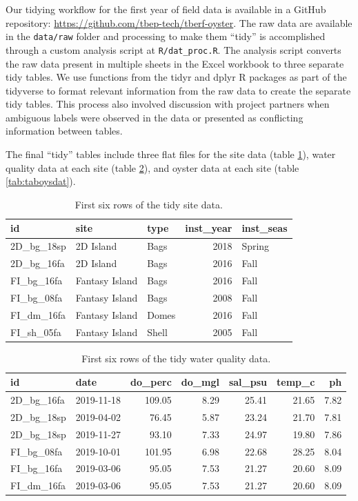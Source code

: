\documentclass[
]{book}
\begin{document}
Our tidying workflow for the first year of field data is available in a GitHub repository: \url{https://github.com/tbep-tech/tberf-oyster}. The raw data are available in the \texttt{data/raw} folder and processing to make them ``tidy'' is accomplished through a custom analysis script at \texttt{R/dat\_proc.R}. The analysis script converts the raw data present in multiple sheets in the Excel workbook to three separate tidy tables. We use functions from the tidyr and dplyr R packages as part of the tidyverse \citep{Wickham19} to format relevant information from the raw data to create the separate tidy tables. This process also involved discussion with project partners when ambiguous labels were observed in the data or presented as conflicting information between tables.

The final ``tidy'' tables include three flat files for the site data (table \ref{tab:tabsitdat}), water quality data at each site (table \ref{tab:tabwqmdat}), and oyster data at each site (table \ref{tab:taboysdat}).

\begin{table}

\caption{\label{tab:tabsitdat}First six rows of the tidy site data.}
\centering
\begin{tabular}[t]{l|l|l|r|l}
\hline
id & site & type & inst\_year & inst\_seas\\
\hline
2D\_bg\_18sp & 2D Island & Bags & 2018 & Spring\\
\hline
2D\_bg\_16fa & 2D Island & Bags & 2016 & Fall\\
\hline
FI\_bg\_16fa & Fantasy Island & Bags & 2016 & Fall\\
\hline
FI\_bg\_08fa & Fantasy Island & Bags & 2008 & Fall\\
\hline
FI\_dm\_16fa & Fantasy Island & Domes & 2016 & Fall\\
\hline
FI\_sh\_05fa & Fantasy Island & Shell & 2005 & Fall\\
\hline
\end{tabular}
\end{table}

\begin{table}

\caption{\label{tab:tabwqmdat}First six rows of the tidy water quality data.}
\centering
\begin{tabular}[t]{l|l|r|r|r|r|r}
\hline
id & date & do\_perc & do\_mgl & sal\_psu & temp\_c & ph\\
\hline
2D\_bg\_16fa & 2019-11-18 & 109.05 & 8.29 & 25.41 & 21.65 & 7.82\\
\hline
2D\_bg\_18sp & 2019-04-02 & 76.45 & 5.87 & 23.24 & 21.70 & 7.81\\
\hline
2D\_bg\_18sp & 2019-11-27 & 93.10 & 7.33 & 24.97 & 19.80 & 7.86\\
\hline
FI\_bg\_08fa & 2019-10-01 & 101.95 & 6.98 & 22.68 & 28.25 & 8.04\\
\hline
FI\_bg\_16fa & 2019-03-06 & 95.05 & 7.53 & 21.27 & 20.60 & 8.09\\
\hline
FI\_dm\_16fa & 2019-03-06 & 95.05 & 7.53 & 21.27 & 20.60 & 8.09\\
\hline
\end{tabular}
\end{table}
\end{document}
